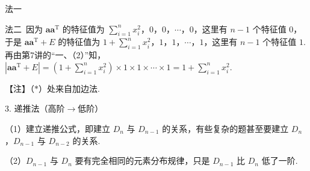 法一


法二\ 因为 $\boldsymbol{aa}^{\mathrm{T}}$ 的特征值为 $\sum\limits_{i=1}^{n}x_i^2$，$0$，$0$，$\cdots$，$0$，这里有 $n-1$ 个特征值 $0$，于是 $\boldsymbol{aa}^{\mathrm{T}}+E$ 的特征值为 $1+\sum\limits_{i=1}^{n}x_i^2$，$1$，$1$，$\cdots$，$1$，这里有 $n-1$ 个特征值 $1$.再由第7讲的“一、（2）”知，$|\boldsymbol{aa}^{\mathrm{T}}+E|=\left(1+\sum\limits_{i=1}^{n}x_i^2\right)\times1\times1\times\cdots\times1=1+\sum\limits_{i=1}^{n}x_i^2$.

\begin{fnote}
【注】（$*$）处来自加边法.
\end{fnote}

\begin{fcard}{3. 递推法（高阶$\to$低阶）}

（1）建立递推公式，即建立 $D_n$ 与 $D_{n-1}$ 的关系，有些复杂的题甚至要建立 $D_n$，$D_{n-1}$ 与 $D_{n-2}$ 的关系.

（2）$D_{n-1}$ 与 $D_n$ 要有完全相同的元素分布规律，只是 $D_{n-1}$ 比 $D_n$ 低了一阶.
\end{fcard}

